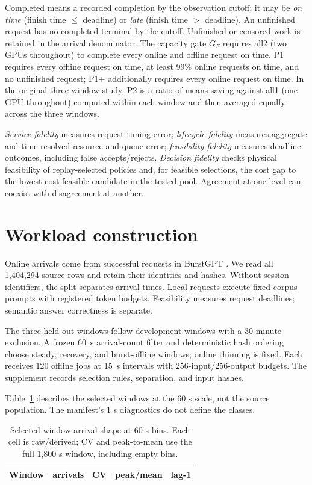 Completed means a recorded completion by the observation cutoff; it may be
\emph{on time} (finish time $\leq$ deadline) or \emph{late} (finish time $>$
deadline). An unfinished request has no completed terminal by the cutoff.
Unfinished or censored work is retained in the arrival denominator. The capacity
gate $G_F$ requires all2 (two GPUs throughout) to complete every online and offline
request on time. P1 requires every offline request on time, at least 99\%
online requests on time, and no unfinished request; P1+ additionally requires
every online request on time. In the original three-window study, P2 is a ratio-of-means saving against all1 (one GPU throughout) computed
within each window and then averaged equally across the three windows.

\emph{Service fidelity} measures request timing error; \emph{lifecycle fidelity}
measures aggregate and time-resolved resource and queue error; \emph{feasibility
fidelity} measures deadline outcomes, including false accepts/rejects.
\emph{Decision fidelity} checks physical feasibility of replay-selected policies
and, for feasible selections, the cost gap to the lowest-cost feasible candidate
in the tested pool. Agreement at one level can coexist with disagreement at another.

\section{Workload construction}
\label{sec:workload}
Online arrivals come from successful requests in BurstGPT
\citep{wang2024burstgpt}. We read all 1,404,294 source rows and retain their
identities and hashes. Without session identifiers, the split separates arrival
times. Local requests execute fixed-corpus prompts with registered token budgets.
Feasibility measures request deadlines; semantic answer correctness is separate.

The three held-out windows follow development windows with a 30-minute
exclusion. A frozen 60~s arrival-count filter and deterministic hash ordering
choose steady, recovery, and burst-offline windows; online thinning is fixed.
Each receives 120 offline jobs at 15~s intervals with 256-input/256-output
budgets. The supplement records selection rules, separation, and input hashes.

Table~\ref{tab:workload} describes the selected windows at the 60 s scale, not the
source population. The manifest's 1 s diagnostics do not define the classes.

\begin{table}[t]
\centering
\fontsize{8.5}{10}\selectfont
\caption{Selected window arrival shape at 60 s bins. Each cell is raw/derived;
CV and peak-to-mean use the full 1,800 s window, including empty bins.}
\label{tab:workload}
\setlength{\tabcolsep}{2pt}
\par\vspace{4pt}
\begin{tabular*}{\linewidth}{@{\extracolsep{\fill}}lrrrr@{}}
\toprule
Window & arrivals & CV & peak/mean & lag-1\\
\midrule

\end{tabular*}
\end{table}

